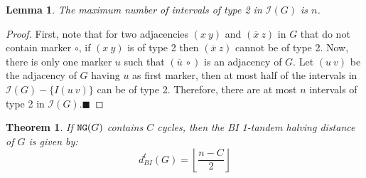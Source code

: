\documentclass[11pt,final,twoside,nofrench]{thlifl}
\newcommand{\qed}{\ensuremath{\blacksquare}}
\newcommand{\fst}[1]{ \ensuremath{#1} }
\newcommand{\snd}[1]{ \ensuremath{\overline{#1}} }
\newcommand\aff[2]{\ensuremath{(\fst{#1}~\fst{#2})}}
\newcommand\asf[2]{\ensuremath{(\snd{#1}~\fst{#2})}}
\renewcommand{\NG}{\ensuremath{\mbox{\texttt{NG}}}}
\newtheorem{proof}{Proof}
\newtheorem{theorem}{Theorem}
\newtheorem{lemma}{Lemma}
\begin{document}
\begin{lemma}
The maximum number of intervals of type 2 in  $\mathcal{I}(G)$ is $n$.
\label{maxType2}
\end{lemma}

\begin{proof}
\label{proof:proofType2}
First, note that for two adjacencies $\aff{x}{y}$ and $\asf{x}{z}$ in $G$ that 
do not contain marker $\circ$, if $\aff{x}{y}$ is of type 2 then $\asf{x}{z}$ 
cannot be of type 2.
Now, there is only one marker $u$ such that  $\asf{u}{\circ}$ is an adjacency 
of $G$. Let $\aff{u}{v}$ be the adjacency of $G$ having $u$ as first marker, 
then at most half of the intervals in $\mathcal{I}(G) - \{I\aff{u}{v}\}$ can 
be of type 2.
Therefore, there are at most $n$ intervals of type 2 in $\mathcal{I}(G)$.\qed

\end{proof}

\begin{theorem}
If $\NG(G)$ contains $C$ cycles, then the BI 1-tandem halving distance of $G$
    is given by: 
$$d^t_{BI}(G) =  \left \lfloor \frac{n - C}{2} \right \rfloor$$
\label{th:distance}
\end{theorem}
\end{document}
